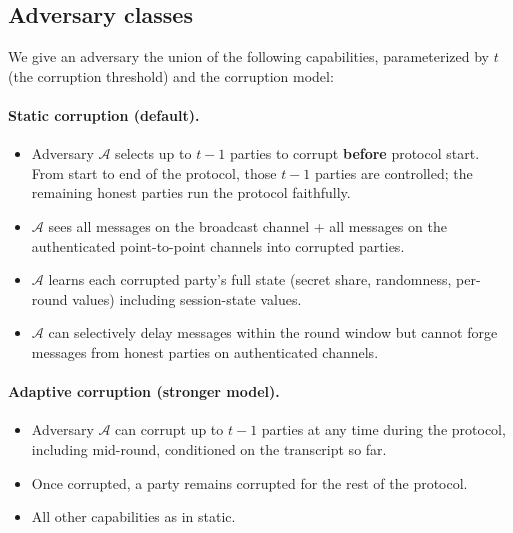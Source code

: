 
\subsection{Adversary classes}

We give an adversary the union of the following capabilities,
parameterized by $t$ (the corruption threshold) and the corruption
model:

\paragraph{Static corruption (default).}

\begin{itemize}[leftmargin=*, itemsep=0pt]
\item Adversary $\mathcal{A}$ selects up to $t-1$ parties to corrupt
\textbf{before} protocol start. From start to end of the protocol,
those $t-1$ parties are controlled; the remaining honest parties run
the protocol faithfully.
\item $\mathcal{A}$ sees all messages on the broadcast channel + all
messages on the authenticated point-to-point channels into corrupted
parties.
\item $\mathcal{A}$ learns each corrupted party's full state (secret
share, randomness, per-round values) including session-state values.
\item $\mathcal{A}$ can selectively delay messages within the round
window but cannot forge messages from honest parties on
authenticated channels.
\end{itemize}

\paragraph{Adaptive corruption (stronger model).}

\begin{itemize}[leftmargin=*, itemsep=0pt]
\item Adversary $\mathcal{A}$ can corrupt up to $t-1$ parties at any
time during the protocol, including mid-round, conditioned on the
transcript so far.
\item Once corrupted, a party remains corrupted for the rest of the
protocol.
\item All other capabilities as in static.
\end{itemize}

